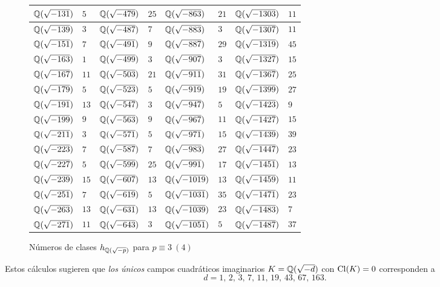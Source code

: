 \begin{figure}
\begin{center}
\begin{tabular}{x{2cm}x{1cm}x{2cm}x{1cm}x{2cm}x{1cm}x{2cm}x{1cm}}
      $\mathbb{Q} (\sqrt{-131})$ & $5$ & $\mathbb{Q} (\sqrt{-479})$ & $25$ & $\mathbb{Q} (\sqrt{-863})$ & $21$ & $\mathbb{Q} (\sqrt{-1303})$ & $11$ \tabularnewline\hline
      $\mathbb{Q} (\sqrt{-139})$ & $3$ & $\mathbb{Q} (\sqrt{-487})$ & $7$ & $\mathbb{Q} (\sqrt{-883})$ & $3$ & $\mathbb{Q} (\sqrt{-1307})$ & $11$ \tabularnewline\hline
      $\mathbb{Q} (\sqrt{-151})$ & $7$ & $\mathbb{Q} (\sqrt{-491})$ & $9$ & $\mathbb{Q} (\sqrt{-887})$ & $29$ & $\mathbb{Q} (\sqrt{-1319})$ & $45$ \tabularnewline\hline
      $\mathbb{Q} (\sqrt{-163})$ & $1$ & $\mathbb{Q} (\sqrt{-499})$ & $3$ & $\mathbb{Q} (\sqrt{-907})$ & $3$ & $\mathbb{Q} (\sqrt{-1327})$ & $15$ \tabularnewline\hline
      $\mathbb{Q} (\sqrt{-167})$ & $11$ & $\mathbb{Q} (\sqrt{-503})$ & $21$ & $\mathbb{Q} (\sqrt{-911})$ & $31$ & $\mathbb{Q} (\sqrt{-1367})$ & $25$ \tabularnewline\hline
      $\mathbb{Q} (\sqrt{-179})$ & $5$ & $\mathbb{Q} (\sqrt{-523})$ & $5$ & $\mathbb{Q} (\sqrt{-919})$ & $19$ & $\mathbb{Q} (\sqrt{-1399})$ & $27$ \tabularnewline\hline
      $\mathbb{Q} (\sqrt{-191})$ & $13$ & $\mathbb{Q} (\sqrt{-547})$ & $3$ & $\mathbb{Q} (\sqrt{-947})$ & $5$ & $\mathbb{Q} (\sqrt{-1423})$ & $9$ \tabularnewline\hline
      $\mathbb{Q} (\sqrt{-199})$ & $9$ & $\mathbb{Q} (\sqrt{-563})$ & $9$ & $\mathbb{Q} (\sqrt{-967})$ & $11$ & $\mathbb{Q} (\sqrt{-1427})$ & $15$ \tabularnewline\hline
      $\mathbb{Q} (\sqrt{-211})$ & $3$ & $\mathbb{Q} (\sqrt{-571})$ & $5$ & $\mathbb{Q} (\sqrt{-971})$ & $15$ & $\mathbb{Q} (\sqrt{-1439})$ & $39$ \tabularnewline\hline
      $\mathbb{Q} (\sqrt{-223})$ & $7$ & $\mathbb{Q} (\sqrt{-587})$ & $7$ & $\mathbb{Q} (\sqrt{-983})$ & $27$ & $\mathbb{Q} (\sqrt{-1447})$ & $23$ \tabularnewline\hline
      $\mathbb{Q} (\sqrt{-227})$ & $5$ & $\mathbb{Q} (\sqrt{-599})$ & $25$ & $\mathbb{Q} (\sqrt{-991})$ & $17$ & $\mathbb{Q} (\sqrt{-1451})$ & $13$ \tabularnewline\hline
      $\mathbb{Q} (\sqrt{-239})$ & $15$ & $\mathbb{Q} (\sqrt{-607})$ & $13$ & $\mathbb{Q} (\sqrt{-1019})$ & $13$ & $\mathbb{Q} (\sqrt{-1459})$ & $11$ \tabularnewline\hline
      $\mathbb{Q} (\sqrt{-251})$ & $7$ & $\mathbb{Q} (\sqrt{-619})$ & $5$ & $\mathbb{Q} (\sqrt{-1031})$ & $35$ & $\mathbb{Q} (\sqrt{-1471})$ & $23$ \tabularnewline\hline
      $\mathbb{Q} (\sqrt{-263})$ & $13$ & $\mathbb{Q} (\sqrt{-631})$ & $13$ & $\mathbb{Q} (\sqrt{-1039})$ & $23$ & $\mathbb{Q} (\sqrt{-1483})$ & $7$ \tabularnewline\hline
      $\mathbb{Q} (\sqrt{-271})$ & $11$ & $\mathbb{Q} (\sqrt{-643})$ & $3$ & $\mathbb{Q} (\sqrt{-1051})$ & $5$ & $\mathbb{Q} (\sqrt{-1487})$ & $37$ \tabularnewline\hline
    \end{tabular}
  \end{center}

  \caption{Números de clases $h_{\mathbb{Q} (\sqrt{-p})}$ para $p \equiv 3~(4)$}
  \label{fig:numeros-de-clases-imaginarios}
\end{figure}

Estos cálculos sugieren que \emph{los únicos} campos cuadráticos imaginarios
$K = \mathbb{Q} (\sqrt{-d})$ con $\operatorname{Cl} (K) = 0$ corresponden a
\[ d = 1, \, 2, \, 3, \, 7, \, 11, \, 19, \, 43, \, 67, \, 163. \]

